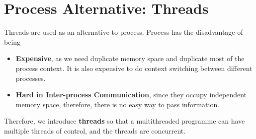 \documentclass[12pt]{article}
\theoremstyle{definition}
\begin{document}
\section{Process Alternative: Threads}
Threads are used as an alternative to process. Process has the disadvantage of being
\begin{itemize}
  \item \textbf{Expensive}, as we need duplicate memory space and duplicate most of the process context. It is also expensive to do context switching between different processes.
  \item \textbf{Hard in Inter-process Communication}, since they occupy independent memory space, therefore, there is no easy way to pass information.
\end{itemize}
Therefore, we introduce \textbf{threads} so that a multithreaded programme can have multiple threads of control, and the threads are concurrent.\\
\end{document}

